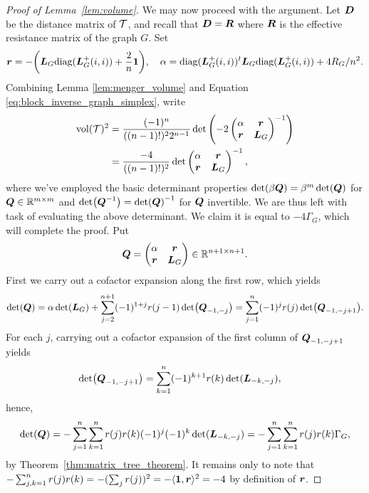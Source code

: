 \begin{proof}[Proof of Lemma~\ref{lem:volume}]
	We may now proceed  with the argument. 
	Let $\vb*{D}$ be the distance matrix of $\mathcal{T}$, and recall that $\vb*{D}=\vb*{R}$ where $\vb*{R}$ is the effective resistance matrix of the graph $G$. 
	Set \[\vb*{r}=-\bigg(\vb*{L}_G\text{diag}(\vb*{L}_G^+(i,i)) + \frac{2}{n}\vb{1}\bigg), \quad \alpha = \text{diag}(\vb*{L}_G^+(i,i))^t \vb*{L}_G\text{diag}(\vb*{L}_G^+(i,i)) + 4R_G/n^2.\] 
	Combining Lemma \ref{lem:menger_volume} and Equation \eqref{eq:block_inverse_graph_simplex}, write 
	\begin{align*}
	\textnormal{vol}(\mathcal{T})^2 &= \frac{(-1)^n }{((n-1)!)^2 2^{n-1}} \det\left(-2\begin{pmatrix}
	\alpha & \vb*{r} \\
	\vb*{r} & \vb*{L}_G
	\end{pmatrix}^{-1}\right) \\
	&= \frac{ -4}{((n-1)!)^2}\det\begin{pmatrix}
	\alpha & \vb*{r} \\
	\vb*{r} & \vb*{L}_G
	\end{pmatrix}^{-1},
	\end{align*}
	where we've employed the basic determinant properties $\det( \beta\vb*{Q})=\beta^{m}\det(\vb*{Q})$ for $\vb*{Q}\in\mathbb{R}^{m\times m}$ and $\det(\vb*{Q}^{-1})=\det(\vb*{Q})^{-1}$ for $\vb*{Q}$ invertible. We are thus left with task of evaluating the above determinant. We claim it is equal to $-4\Gamma_G$,  which will complete the proof. 
	Put 
	\[\vb*{Q} = \begin{pmatrix}
	\alpha & \vb*{r}\\ \vb*{r}& \vb*{L}_G
	\end{pmatrix}\in\mathbb{R}^{n+1\times n+1}.\]
	First we carry out a cofactor expansion along the first row, which yields 
	\begin{align*}
	\det(\vb*{Q}) = \alpha \det(\vb*{L}_G) + \sum_{j=2}^{n+1}(-1)^{1+j}r({j-1}) \det(\vb*{Q}_{-1,-j}) = \sum_{j=1}^n (-1)^j r(j) \det(\vb*{Q}_{-1,-j+1}).
	\end{align*}
	For each $j$, carrying out a cofactor expansion of the first column of $\vb*{Q}_{-1,-j+1}$ yields 
	\begin{align*}
	\det(\vb*{Q}_{-1,-j+1}) &= \sum_{k=1}^n (-1)^{k+1}r(k) \det(\vb*{L}_{-k,-j}),
	\end{align*}
	hence, 
	\begin{align*}
	\det(\vb*{Q}) = - \sum_{j=1}^n \sum_{k=1}^n r(j)r(k)(-1)^j(-1)^k  \det(\vb*{L}_{-k,-j}) = - \sum_{j=1}^n \sum_{k=1}^n r(j)r(k)\Gamma_G,
	\end{align*}
	by Theorem~\ref{thm:matrix_tree_theorem}. It remains only to note that 
	$-\sum_{j,k=1}^n r(j) r(k) = -(\sum_j r(j))^2 = - \langle \vb{1},\vb*{r}\rangle ^2 = - 4$ 
	by  definition  of $\vb*{r}$. 
\end{proof}

